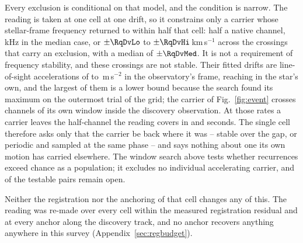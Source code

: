Every exclusion is conditional on that model, and the condition is narrow. The reading is taken at one cell at one drift, so it constrains only a
carrier whose stellar-frame frequency returned to within half that cell:
half a native channel, \RqHalfChanKHz\,kHz in the median case, or
$\pm\RqDvLo$ to $\pm\RqDvHi$\,km\,s$^{-1}$ across the \RcNExcl{}
crossings that carry an exclusion, with a median of $\pm\RqDvMed$. It is not a requirement of frequency stability, and these crossings are
not stable. Their fitted drifts are line-of-sight accelerations of
\ZtALosLo{} to \ZtALosHi\,m\,s$^{-2}$ in the observatory's frame, reaching
\EgStarALosHi{} in the star's own, and the largest of them is a lower bound
because the search found its maximum on the outermost trial of the grid; the
carrier of
Fig.~\ref{fig:event} crosses \EvADriftChan{} channels of its own window
inside the discovery observation. At those rates a carrier leaves the
half-channel the reading covers in \ZtSxLeaveSec{} and \ZtCpLeaveSec{}
seconds. The single cell therefore asks
only that the carrier be back where it was -- stable over the gap, or
periodic and sampled at the same phase -- and says nothing about one its own
motion has carried elsewhere. The window search above tests whether
recurrences exceed chance as a population; it excludes no individual
accelerating carrier, and \TjNOpen{} of the \TjNPair{} testable pairs remain
open.

Neither the registration nor the anchoring of that cell changes any of
this. The reading was re-made over every cell within the measured
registration residual and at every anchor along the discovery track, and
no anchor recovers anything anywhere in this survey
(Appendix~\ref{sec:regbudget}).

